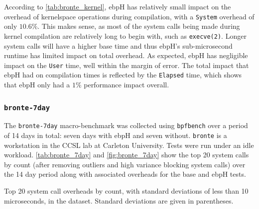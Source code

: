 \documentclass[
  12pt]{findlay}
\newcommand{\passthrough}[1]{#1}
\begin{document}
According to \autoref{tab:bronte_kernel}, ebpH has relatively small
impact on the overhead of kernelspace operations during compilation,
with a \passthrough{\lstinline!System!} overhead of only \(10.6\%\).
This makes sense, as most of the system calls being made during kernel
compilation are relatively long to begin with, such as
\passthrough{\lstinline!execve(2)!}. Longer system calls will have a
higher base time and thus ebpH's sub-microsecond runtime has limited
impact on total overhead. As expected, ebpH has negligible impact on the
\passthrough{\lstinline!User!} time, well within the margin of error.
The total impact that ebpH had on compilation times is reflected by the
\passthrough{\lstinline!Elapsed!} time, which shows that ebpH only had a
\(1\%\) performance impact overall.

\hypertarget{bronte-7day}{%
\subsubsection{\texorpdfstring{\texttt{bronte-7day}}{bronte-7day}}\label{bronte-7day}}

\label{bronte_7day}

The \passthrough{\lstinline!bronte-7day!} macro-benchmark was collected
using \passthrough{\lstinline!bpfbench!} over a period of 14 days in
total: seven days with ebpH and seven without.
\passthrough{\lstinline!bronte!} is a workstation in the CCSL lab at
Carleton University. Tests were run under an idle workload.
\autoref{tab:bronte_7day} and \autoref{fig:bronte_7day} show the top 20
system calls by count (after removing outliers and high variance
blocking system calls) over the 14 day period along with associated
overheads for the base and ebpH tests.

\begin{table}
    \caption[Top 20 system call overheads by count in the  dataset]{
        Top 20 system call overheads by count, with standard deviations of less than 10 microseconds,
        in the  dataset.
        Standard deviations are given in parentheses.
    }
    \label{tab:bronte_7day}
    \resizebox{\columnwidth}{!}{
    
    }
\end{table}
\end{document}
